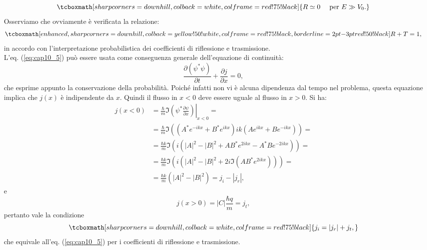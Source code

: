 \documentclass[a4paper,12pt,oneside]{book}
\begin{document}
	\begin{equation}
		\tcboxmath[sharp corners=downhill, colback=white, colframe=red!75!black]{
			R\simeq 0\quad  \textrm{ per } E\gg V_0.
			}
	\end{equation}
Osserviamo che ovviamente è verificata la relazione:
	\begin{equation}
		\tcboxmath[enhanced, sharp corners=downhill, colback=yellow!50!white, colframe=red!75!black, borderline={2pt}{-3pt}{red!50!black}]{
			R+T=1,
			}
	\label{eq:cap10_5}
	\end{equation}
in accordo con l'interpretazione probabilistica dei coefficienti di riflessione e trasmissione.\\

L'eq. (\ref{eq:cap10_5}) può essere usata come conseguenza generale dell'equazione di continuità:
	\begin{equation}
		\frac{\partial \left(\psi^* \psi \right)}{\partial t}+ \frac{\partial j}{\partial x}=0,
	\end{equation}
che esprime appunto la conservazione della probabilità. Poiché infatti non vi è alcuna dipendenza dal tempo nel problema, questa equazione implica che $j(x)$ è indipendente da $x$. Quindi il flusso in $x<0$ deve essere uguale al flusso in $x>0$. Si ha:
	\begin{align}
		j\left( x<0 \right) &= \frac{\hbar}{m} \Im \left. \left( \psi ^* \frac{\partial \psi}{\partial x} \right) \right| _{x<0} = \nonumber \\
		&= \frac{\hbar}{m} \Im \left( \left( A^* e^{-ikx} + B^* e^{ikx}\right)ik \left( A e^{ikx} + B e^{-ikx}\right)\right)= \nonumber \\
		&=\frac{\hbar k}{m} \Im \left( i\left( |A|^2 - |B|^2 +AB^* e^{2ikx}- A^* B e^{-2ikx}\right)\right)= \nonumber \\
		&=\frac{\hbar k}{m} \Im \left( i\left( |A|^2 - |B|^2 +2i \Im \left( A B^* e^{2ikx}\right) \right)\right)= \nonumber \\
		&= \frac{\hbar k}{m}\left( |A|^2 - |B|^2\right)= j_i- |j_r|,
\end{align}
e
	\begin{equation}
		j\left( x>0 \right) = |C| \frac{\hbar q}{m}= j_t,
	\end{equation}
pertanto vale la condizione
	\begin{equation}
		\tcboxmath[sharp corners=downhill, colback=white, colframe=red!75!black]{
			j_i = |j_r|+ j_t,
			}
	\end{equation}
che equivale all'eq. (\ref{eq:cap10_5}) per i coefficienti di riflessione e trasmissione.\\
\end{document}
